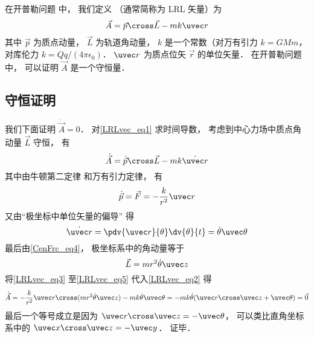 

在开普勒问题%
中， 我们定义 （通常简称为 LRL 矢量）为
\begin{equation}\label{LRLvec_eq1}
\vec A = \vec p \cross \vec L - mk \uvec r
\end{equation}
其中 $\vec p$ 为质点动量， $\vec L$ 为轨道角动量， $k$ 是一个常数（对万有引力 $k = GMm$， 对库伦力 $k = Qq/(4\pi\epsilon_0)$． $\uvec r$ 为质点位矢 $\vec r$ 的单位矢量． 在开普勒问题%
中， 可以证明 $\vec A$ 是一个守恒量．

\subsection{守恒证明}
我们下面证明 $\dot{\vec A} = 0$． 对\autoref{LRLvec_eq1} 求时间导数， 考虑到中心力场中质点角动量 $\vec L$ 守恒， 有
\begin{equation}\label{LRLvec_eq2}
\dot{\vec A} = \dot{\vec p}\cross \vec L  - mk\dot{\uvec r}
\end{equation}
其中由牛顿第二定律 和万有引力定律， 有
\begin{equation}\label{LRLvec_eq3}
\dot{\vec p} = \vec F = - \frac{k}{r^2}\uvec r
\end{equation}
又由“极坐标中单位矢量的偏导” 得
\begin{equation}\label{LRLvec_eq4}
\dot{\uvec r} = \pdv{\uvec r}{\theta} \dv{\theta}{t} = \dot\theta\uvec \theta
\end{equation}
最后由\autoref{CenFrc_eq4}， 极坐标系中的角动量等于
\begin{equation}\label{LRLvec_eq5}
\vec L = mr^2\dot \theta \uvec z
\end{equation}
将\autoref{LRLvec_eq3} 至\autoref{LRLvec_eq5} 代入\autoref{LRLvec_eq2} 得
\begin{equation}
\dot{\vec A} = -\frac{k}{r^2}\uvec r \cross (mr^2\dot\theta\uvec z) - mk\dot\theta\uvec\theta
=-mk\dot\theta (\uvec r\cross \uvec z + \uvec \theta)
= \vec 0
\end{equation}
最后一个等号成立是因为 $\uvec r\cross\uvec z = -\uvec\theta$， 可以类比直角坐标系中的 $\uvec x\cross\uvec z = -\uvec y$． 证毕．

